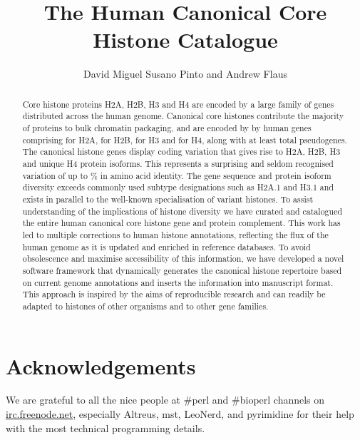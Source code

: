 \documentclass[10pt,a4paper,onecolumn,article,draft]{memoir}
\author{David Miguel Susano Pinto and Andrew Flaus}
\title{The Human Canonical Core Histone Catalogue}
\begin{document}
  \maketitle

  \begin{abstract}
	Core histone proteins H2A, H2B, H3 and H4 are encoded 
	by a large family of genes distributed across the human genome.
	Canonical core histones contribute the majority of proteins to bulk chromatin packaging, 
	and are encoded by \TotalCodingGenes{} by human genes comprising 
	\HTwoACodingGenes{} for H2A,
	\HTwoBCodingGenes{} for H2B,
	\HThreeCodingGenes{} for H3 
	and \HFourCodingGenes{} for H4, 
	along with at least \TotalPseudoGenes{} total pseudogenes.
	The canonical histone genes display coding variation that gives rise to
	\HTwoAUniqueProteins{} H2A, \HTwoBUniqueProteins{} H2B, 
	\HThreeUniqueProteins{} H3 and \HFourUniqueProteins{} unique H4 protein isoforms.
	This represents a surprising and seldom recognised variation
	of up to \% in amino acid identity. 
	The gene sequence and protein isoform diversity 
	exceeds commonly used subtype designations such as H2A.1 and H3.1
	and exists in parallel to the well-known specialisation of variant histones. 
	To assist understanding of the implications of histone diversity 
	we have curated and catalogued the entire human canonical core histone gene and protein complement.
	This work has led to multiple corrections to human histone annotations, 
	reflecting the flux of the human genome as it is updated and enriched in reference databases. 
	To avoid obsolescence and maximise accessibility of this information, 
	we have developed a novel software framework that dynamically generates the canonical histone repertoire 
	based on current genome annotations and inserts the information into manuscript format. 
	This approach is inspired by the aims of reproducible research 
	and can readily be adapted to histones of other organisms and to other gene families.
  \end{abstract}

  
  
  
  
  
  

  \section{Acknowledgements}
    We are grateful to all the nice people at \#perl and \#bioperl channels on
    \url{irc.freenode.net}, especially Altreus, mst, LeoNerd, and pyrimidine for
    their help with the most technical programming details.
\end{document}
